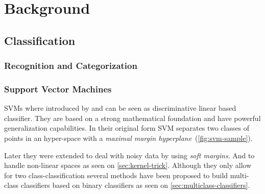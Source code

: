 \chapter{Background}\label{chap:background}
%
%
%

\section{Classification}
\subsection{Recognition and Categorization}
\subsection{Support Vector Machines}
\Glspl{SVM} where introduced by \cite{cortes1995support} and can be seen as
discriminative linear based classifier. They are based on a strong mathematical
foundation and have powerful generalization capabilities. In their original form
\gls{SVM} separates two classes of points in an hyper-space with a
\emph{maximal margin hyperplane}~(\autoref{fig:svm-sample}).

Later they were extended to deal with noisy data by using \emph{soft margins}.
And to handle non-linear spaces as seen on \autoref{sec:kernel-trick}.
Although they only allow for two class-classification several methods have been
proposed to build multi-class classifiers based on binary classifiers as seen on
\autoref{sec:multiclass-classifiers}.

